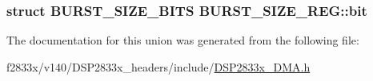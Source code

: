 \subsubsection[{bit}]{\setlength{\rightskip}{0pt plus 5cm}struct {\bf B\+U\+R\+S\+T\+\_\+\+S\+I\+Z\+E\+\_\+\+B\+I\+T\+S} B\+U\+R\+S\+T\+\_\+\+S\+I\+Z\+E\+\_\+\+R\+E\+G\+::bit}\label{union_b_u_r_s_t___s_i_z_e___r_e_g_a1c5ea2df20b855abba5769efbdd3d0dc}


The documentation for this union was generated from the following file\+:\begin{DoxyCompactItemize}
\item 
f2833x/v140/\+D\+S\+P2833x\+\_\+headers/include/\hyperlink{_d_s_p2833x___d_m_a_8h}{D\+S\+P2833x\+\_\+\+D\+M\+A.\+h}\end{DoxyCompactItemize}

